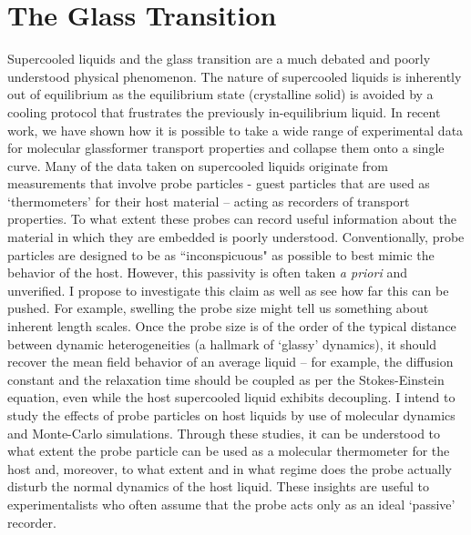 \documentclass[11pt]{article}
\begin{document}
\section{The Glass Transition}
Supercooled liquids and the glass transition are a much debated and poorly understood physical phenomenon.  The nature of supercooled liquids is inherently out of equilibrium as the equilibrium state (crystalline solid) is avoided by a cooling protocol that frustrates the previously in-equilibrium liquid.  In recent work, we have shown how it is possible to take a wide range of experimental data for molecular glassformer transport properties and collapse them onto a single curve. Many of the data taken on supercooled liquids originate from measurements that involve probe particles - guest particles that are used as `thermometers' for their host material  -- acting as recorders of transport properties.  To what extent these probes can record useful information about the material in which they are embedded is poorly understood.  Conventionally, probe particles are designed to be as ``inconspicuous" as possible to best mimic the behavior of the host.  However, this passivity is often taken {\it a priori} and unverified. I propose to investigate this claim as well as see how far this can be pushed.  For example, swelling the probe size might tell us something about inherent length scales.   Once the probe size is of the order of the typical distance between dynamic heterogeneities (a hallmark of `glassy' dynamics), it should recover the mean field behavior of an average liquid -- for example, the diffusion constant and the relaxation time should be coupled as per the Stokes-Einstein equation, even while the host supercooled liquid exhibits decoupling. I intend to study the effects of probe particles on host liquids by use of molecular dynamics and Monte-Carlo simulations.  Through these studies, it can be understood to what extent the probe particle can be used as a molecular thermometer for the host and, moreover, to what extent and in what regime does the probe actually disturb the normal dynamics of the host liquid.  These insights are useful to experimentalists who often assume that the probe acts only as an ideal `passive' recorder.  
\end{document}
